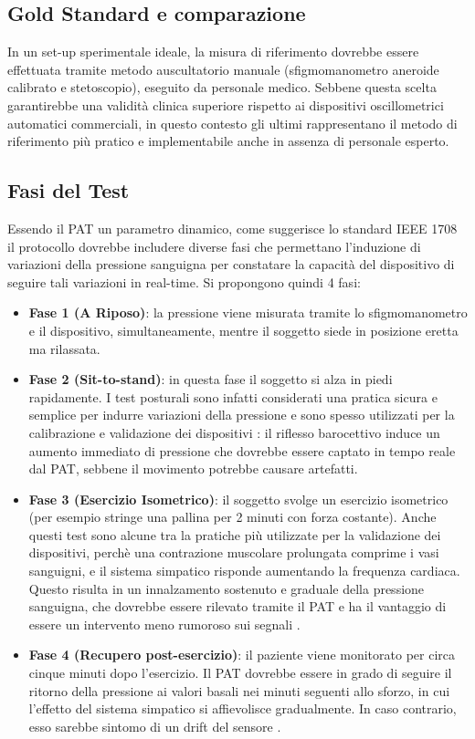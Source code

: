 \documentclass[11pt,a4paper]{article}
\begin{document}
\subsection{Gold Standard e comparazione}
In un set-up sperimentale ideale, la misura di riferimento dovrebbe essere effettuata tramite metodo auscultatorio manuale (sfigmomanometro aneroide calibrato e stetoscopio), eseguito da personale medico. Sebbene questa scelta garantirebbe una validità clinica superiore rispetto ai dispositivi oscillometrici automatici commerciali, in questo contesto gli ultimi rappresentano il metodo di riferimento più pratico e implementabile anche in assenza di personale esperto. 
\subsection{Fasi del Test}
\label{Fasi del Test}
Essendo il PAT un parametro dinamico, come suggerisce lo standard IEEE 1708 \cite{ieee1708} il protocollo dovrebbe includere diverse fasi che permettano l'induzione di variazioni della pressione sanguigna per constatare la capacità del dispositivo di seguire tali variazioni in real-time. Si propongono quindi 4 fasi:
\begin{itemize}
    \item \textbf{Fase 1 (A Riposo)}: la pressione viene misurata tramite lo sfigmomanometro e il dispositivo, simultaneamente, mentre il soggetto siede in posizione eretta ma rilassata.
    \item \textbf{Fase 2 (Sit-to-stand)}: in questa fase il soggetto si alza in piedi rapidamente. I test posturali sono infatti considerati una pratica sicura e semplice per indurre variazioni della pressione e sono spesso utilizzati per la calibrazione e validazione dei dispositivi \cite{ieee1708}\cite{gesche2012}: il riflesso barocettivo induce un aumento immediato di pressione che dovrebbe essere captato in tempo reale dal PAT, sebbene il movimento potrebbe causare artefatti.
    \item \textbf{Fase 3 (Esercizio Isometrico)}: il soggetto svolge un esercizio isometrico (per esempio stringe una pallina per 2 minuti con forza costante). Anche questi test sono alcune tra la pratiche più utilizzate per la validazione dei dispositivi, perchè una contrazione muscolare prolungata comprime i vasi sanguigni, e il sistema simpatico risponde aumentando la frequenza cardiaca. Questo risulta in un innalzamento sostenuto e graduale della pressione sanguigna, che dovrebbe essere rilevato tramite il PAT e ha il vantaggio di essere un intervento meno rumoroso sui segnali \cite{payne2006}.
    \item \textbf{Fase 4 (Recupero post-esercizio)}: il paziente viene monitorato per circa cinque minuti dopo l'esercizio. Il PAT dovrebbe essere in grado di seguire il ritorno della pressione ai valori basali nei minuti seguenti allo sforzo, in cui l'effetto del sistema simpatico si affievolisce gradualmente. In caso contrario, esso sarebbe sintomo di un drift del sensore \cite{payne2006}. 
\end{itemize}
\end{document}
